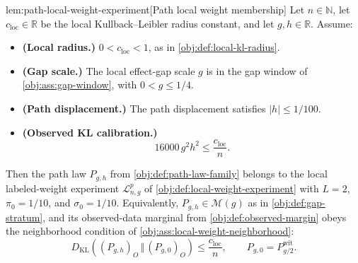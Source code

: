 \documentclass[11pt]{article}
\begin{document}
\begin{lemmav}{lem:path-local-weight-experiment}[Path local weight membership]
Let \(n\in\mathbb N\), let \(c_{\mathrm{loc}}\in\mathbb R\) be the local Kullback--Leibler radius constant, and let \(g,h\in\mathbb R\). Assume:
\begin{itemize}
\item \textbf{(Local radius.)} \(0<c_{\mathrm{loc}}<1\), as in \cref{obj:def:local-kl-radius}.
\item \textbf{(Gap scale.)} The local effect-gap scale \(g\) is in the gap window of \cref{obj:ass:gap-window}, with \(0<g\le 1/4\).
\item \textbf{(Path displacement.)} The path displacement satisfies \(|h|\le 1/100\).
\item \textbf{(Observed KL calibration.)}
\[
16000\,g^2h^2\le \frac{c_{\mathrm{loc}}}{n}.
\]
\end{itemize}
Then the path law \(P_{g,h}\) from \cref{obj:def:path-law-family} belongs to the local labeled-weight experiment \(\mathcal L_{n,g}^p\) of \cref{obj:def:local-weight-experiment} with \(L=2\), \(\pi_0=1/10\), and \(\sigma_0=1/10\). Equivalently, \(P_{g,h}\in\mathcal M(g)\) as in \cref{obj:def:gap-stratum}, and its observed-data marginal from \cref{obj:def:observed-margin} obeys the neighborhood condition of \cref{obj:ass:local-weight-neighborhood}:
\[
D_{\mathrm{KL}}\!\left((P_{g,h})_O\,\Vert\,(P_{g,0})_O\right)
\le \frac{c_{\mathrm{loc}}}{n},
\qquad
P_{g,0}=P^{\mathrm{wit}}_{g/2}.
\]
\end{lemmav}
\end{document}
